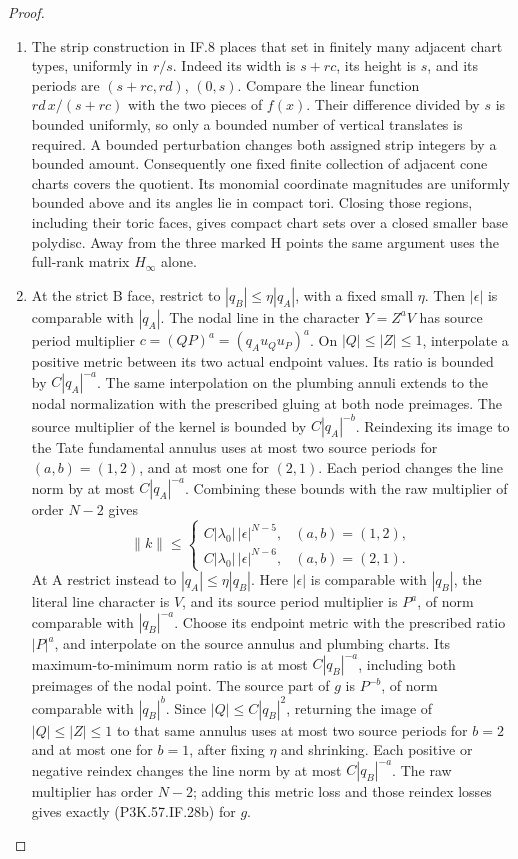 \begin{proof}
\begin{enumerate}[label=\arabic*.]
\item The strip construction in IF.8 places that set in finitely
many adjacent chart types, uniformly in \(r/s\). Indeed
its width is \(s+rc\), its height is \(s\), and its
periods are \((s+rc,rd)\), \((0,s)\). Compare the
linear function \(rd\,x/(s+rc)\) with the two pieces
of \(f(x)\). Their difference divided by \(s\) is
bounded uniformly, so only a bounded number of vertical
translates is required. A bounded perturbation changes
both assigned strip integers by a bounded amount.
Consequently one fixed finite collection of adjacent
cone charts covers the quotient. Its monomial coordinate
magnitudes are uniformly bounded above and its angles
lie in compact tori. Closing those regions, including
their toric faces, gives compact chart sets over a
closed smaller base polydisc. Away from the three
marked H points the same argument uses the full-rank
matrix \(H_\infty\) alone.

\item At the strict B face, restrict to
\(|q_B|\le\eta|q_A|\), with a fixed small \(\eta\).
Then \(|\epsilon|\) is comparable with \(|q_A|\).
The nodal line in the character \(Y=Z^aV\) has source
period multiplier \(c=(QP)^a=(q_Au_Qu_P)^a\).
On \(|Q|\le|Z|\le1\), interpolate a positive metric
between its two actual endpoint values. Its ratio is
bounded by \(C|q_A|^{-a}\). The same interpolation on
the plumbing annuli extends to the nodal normalization
with the prescribed gluing at both node preimages.
The source multiplier of the kernel is bounded by
\(C|q_A|^{-b}\). Reindexing its image to the Tate
fundamental annulus uses at most two source periods
for \((a,b)=(1,2)\), and at most one for \((2,1)\).
Each period changes the line norm by at most
\(C|q_A|^{-a}\). Combining these bounds with the
raw multiplier of order \(N-2\) gives
\[
 \|k\|\le
 \begin{cases}
 C|\lambda_0|\,|\epsilon|^{N-5},&(a,b)=(1,2),\\
 C|\lambda_0|\,|\epsilon|^{N-6},&(a,b)=(2,1).
 \end{cases}                                            \tag{P3K.57.IF.28b}
\]
At A restrict instead to \(|q_A|\le\eta|q_B|\).
Here \(|\epsilon|\) is comparable with \(|q_B|\),
the literal line character is \(V\), and its source
period multiplier is \(P^a\), of norm comparable
with \(|q_B|^{-a}\). Choose its endpoint metric
with the prescribed ratio \(|P|^a\), and interpolate
on the source annulus and plumbing charts. Its
maximum-to-minimum norm ratio is at most
\(C|q_B|^{-a}\), including both preimages of the
nodal point. The source part of \(g\) is
\(P^{-b}\), of norm comparable with \(|q_B|^b\).
Since \(|Q|\le C|q_B|^2\), returning the image of
\(|Q|\le|Z|\le1\) to that same annulus uses at most
two source periods for \(b=2\) and at most one for
\(b=1\), after fixing \(\eta\) and shrinking.
Each positive or negative reindex changes the line
norm by at most \(C|q_B|^{-a}\). The raw multiplier
has order \(N-2\); adding this metric loss and those
reindex losses gives exactly (P3K.57.IF.28b) for \(g\).


\end{enumerate}
\end{proof}
